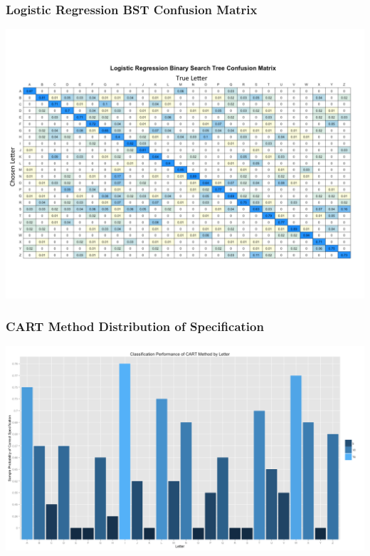 \documentclass{beamer}
\begin{document}
\begin{frame}
\frametitle{Logistic Regression BST Confusion Matrix}
\begin{center} 
\includegraphics[width=1 \textwidth]{hkPercent}
\end{center}
\end{frame}

\begin{frame}
\frametitle{CART Method Distribution of Specification}
\begin{center} 
\includegraphics[width=1 \textwidth]{cartPlot}
\end{center}
\end{frame}
\end{document}
